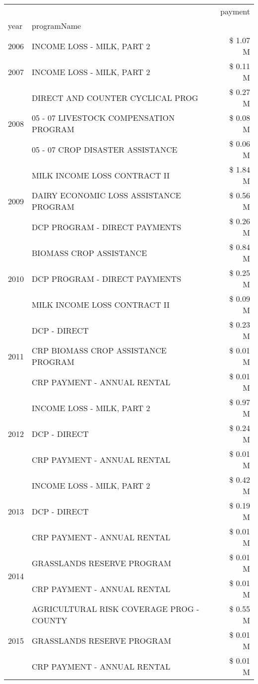 \begin{tabular}{llr}
\toprule
 &  & payment \\
year & programName &  \\
\midrule
2006 & INCOME LOSS - MILK, PART 2 & \$ 1.07 M \\
\cline{1-3}
2007 & INCOME LOSS - MILK, PART 2 & \$ 0.11 M \\
\cline{1-3}
\multirow[t]{3}{*}{2008} & DIRECT AND COUNTER CYCLICAL PROG & \$ 0.27 M \\
 & 05 - 07 LIVESTOCK COMPENSATION PROGRAM & \$ 0.08 M \\
 & 05 - 07 CROP DISASTER ASSISTANCE & \$ 0.06 M \\
\cline{1-3}
\multirow[t]{3}{*}{2009} & MILK INCOME LOSS CONTRACT II & \$ 1.84 M \\
 & DAIRY ECONOMIC LOSS ASSISTANCE PROGRAM & \$ 0.56 M \\
 & DCP PROGRAM - DIRECT PAYMENTS & \$ 0.26 M \\
\cline{1-3}
\multirow[t]{3}{*}{2010} & BIOMASS CROP ASSISTANCE & \$ 0.84 M \\
 & DCP PROGRAM - DIRECT PAYMENTS & \$ 0.25 M \\
 & MILK INCOME LOSS CONTRACT II & \$ 0.09 M \\
\cline{1-3}
\multirow[t]{3}{*}{2011} & DCP - DIRECT & \$ 0.23 M \\
 & CRP BIOMASS CROP ASSISTANCE PROGRAM & \$ 0.01 M \\
 & CRP PAYMENT - ANNUAL RENTAL & \$ 0.01 M \\
\cline{1-3}
\multirow[t]{3}{*}{2012} & INCOME LOSS - MILK, PART 2 & \$ 0.97 M \\
 & DCP - DIRECT & \$ 0.24 M \\
 & CRP PAYMENT - ANNUAL RENTAL & \$ 0.01 M \\
\cline{1-3}
\multirow[t]{3}{*}{2013} & INCOME LOSS - MILK, PART 2 & \$ 0.42 M \\
 & DCP - DIRECT & \$ 0.19 M \\
 & CRP PAYMENT - ANNUAL RENTAL & \$ 0.01 M \\
\cline{1-3}
\multirow[t]{2}{*}{2014} & GRASSLANDS RESERVE PROGRAM & \$ 0.01 M \\
 & CRP PAYMENT - ANNUAL RENTAL & \$ 0.01 M \\
\cline{1-3}
\multirow[t]{3}{*}{2015} & AGRICULTURAL RISK COVERAGE PROG - COUNTY & \$ 0.55 M \\
 & GRASSLANDS RESERVE PROGRAM & \$ 0.01 M \\
 & CRP PAYMENT - ANNUAL RENTAL & \$ 0.01 M \\

\end{tabular}
